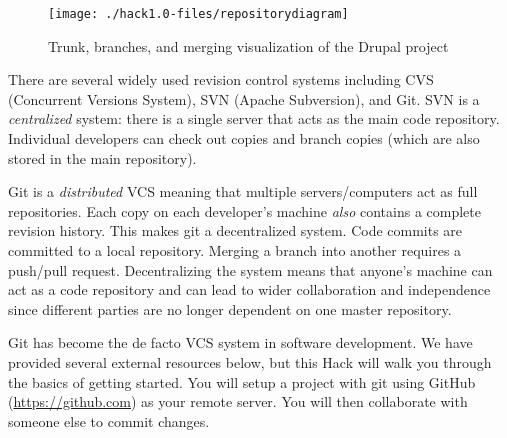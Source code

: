 \documentclass[12pt]{scrartcl}
\begin{document}
\begin{figure}[h]
\centering
\texttt{[image: ./hack1.0-files/repositorydiagram]}
\caption{Trunk, branches, and merging visualization of the Drupal project}
\end{figure}

There are several widely used revision control systems including 
CVS (Concurrent Versions System), SVN (Apache Subversion), and 
Git.  SVN is a \emph{centralized} system: there is a single server that 
acts as the main code repository.  Individual developers can check out 
copies and branch copies (which are also stored in the main repository).  

Git is a \emph{distributed} VCS meaning that multiple servers/computers 
act as full repositories.  Each copy on each developer's machine 
\emph{also} contains a complete revision history.  This makes git a 
decentralized system.  Code commits are committed to a local repository.  
Merging a branch into another requires a push/pull request.  
Decentralizing the system means that anyone's 
machine can act as a code repository and can lead to wider collaboration 
and independence since different parties are no longer dependent on 
one master repository.

Git has become the de facto VCS system in software development.  We have
provided several external resources below, but this Hack will walk you
through the basics of getting started.  You will setup a project with 
git using GitHub (\url{https://github.com}) as your remote server.  You
will then collaborate with someone else to commit changes.
\end{document}
